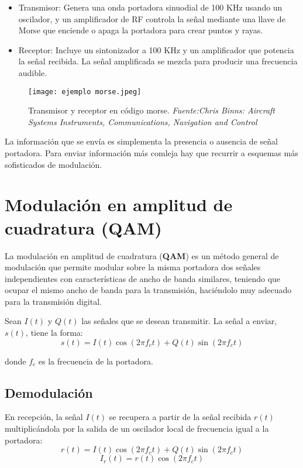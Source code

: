 \begin{itemize}
\item Transmisor: Genera una onda portadora sinuodial de 100 KHz usando un oscilador, y un amplificador de RF controla la señal mediante una llave de Morse que enciende o apaga la portadora para crear puntos y rayas.
\item Receptor: Incluye un sintonizador a 100 KHz y un amplificador que potencia la señal recibida. La señal amplificada se mezcla para producir una frecuencia audible.\\
\end{itemize}

\begin{figure}[H]
    \centering
    \texttt{[image: ejemplo morse.jpeg]}
    \caption{\centering Transmisor y receptor en código morse. \textit{Fuente:Chris Binns: Aircraft Systems Instruments, Communications, Navigation and Control}}
    \label{fig:placeholder}
\end{figure}

La información que se envía es simplementa la presencia o ausencia de señal portadora. Para enviar información más comleja hay que recurrir a esquemas más sofisticados de modulación.\\

\section{Modulación en amplitud de cuadratura (QAM)}
La modulación en amplitud de cuadratura (\textbf{QAM}) es un método general de modulación que permite modular sobre la misma portadora dos señales independientes con características de ancho de banda similares, teniendo que ocupar el mismo ancho de banda para la transmisión, haciéndolo muy adecuado para la transmisión digital.\\

\begin{definicion}
Sean \( I(t) \) y \( Q(t) \) las señales que se desean transmitir. La señal a enviar, \( s(t) \), tiene la forma:
\begin{equation}
s(t) = I(t) \cos(2\pi f_c t) + Q(t) \sin(2\pi f_c t)
\end{equation}
\end{definicion}

donde \( f_c \) es la frecuencia de la portadora.

\subsection{Demodulación}
En recepción, la señal \( I(t) \) se recupera a partir de la señal recibida \( r(t) \) multiplicándola por la salida de un oscilador local de frecuencia igual a la portadora:
\[
r(t) = I(t) \cos(2\pi f_c t) + Q(t) \sin(2\pi f_c t)
\]
\[
I_r(t) = r(t) \cos(2\pi f_c t)
\]

